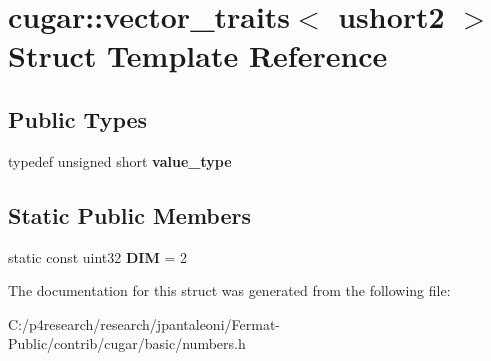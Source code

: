 \hypertarget{structcugar_1_1vector__traits_3_01ushort2_01_4}{}\section{cugar\+:\+:vector\+\_\+traits$<$ ushort2 $>$ Struct Template Reference}
\label{structcugar_1_1vector__traits_3_01ushort2_01_4}
\subsection*{Public Types}
\begin{DoxyCompactItemize}
\item 
\mbox{\label{structcugar_1_1vector__traits_3_01ushort2_01_4_a541d946778fcb4b1b201afc0e2b2fb32}} 
typedef unsigned short {\bfseries value\+\_\+type}
\end{DoxyCompactItemize}
\subsection*{Static Public Members}
\begin{DoxyCompactItemize}
\item 
\mbox{\label{structcugar_1_1vector__traits_3_01ushort2_01_4_a4fb1f176c3d485a8298210b9f648de4e}} 
static const uint32 {\bfseries D\+IM} = 2
\end{DoxyCompactItemize}


The documentation for this struct was generated from the following file\+:\begin{DoxyCompactItemize}
\item 
C\+:/p4research/research/jpantaleoni/\+Fermat-\/\+Public/contrib/cugar/basic/numbers.\+h\end{DoxyCompactItemize}
